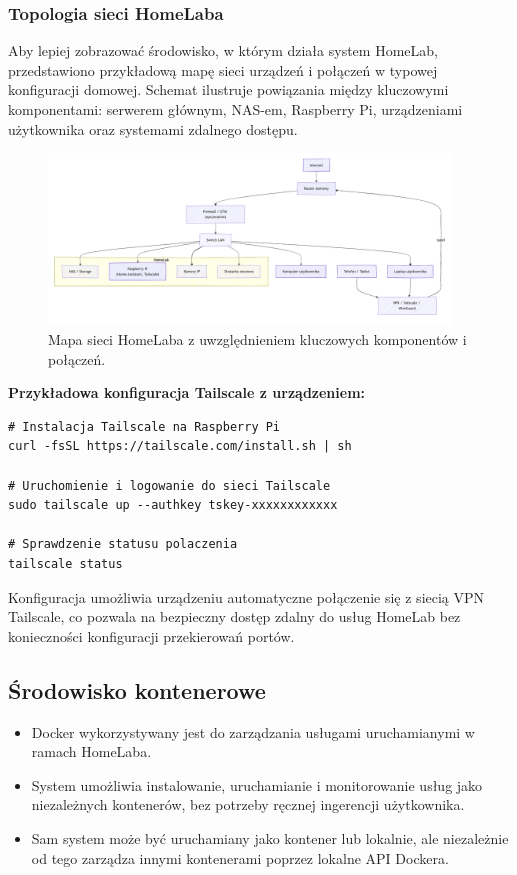 \subsubsection{Topologia sieci HomeLaba}
Aby lepiej zobrazować środowisko, w którym działa system HomeLab, przedstawiono przykładową mapę sieci urządzeń i połączeń w typowej konfiguracji domowej. Schemat ilustruje powiązania między kluczowymi komponentami: serwerem głównym, NAS-em, Raspberry Pi, urządzeniami użytkownika oraz systemami zdalnego dostępu.

\begin{figure}[H]
\centering
\includegraphics[width=0.95\textwidth]{./chapters/mermeid/schemat sieci homelab.png}
\caption{Mapa sieci HomeLaba z uwzględnieniem kluczowych komponentów i połączeń.}
\label{fig:network_map}
\end{figure}
\textbf{Przykładowa konfiguracja Tailscale z urządzeniem:}

\begin{lstlisting}
# Instalacja Tailscale na Raspberry Pi
curl -fsSL https://tailscale.com/install.sh | sh

# Uruchomienie i logowanie do sieci Tailscale
sudo tailscale up --authkey tskey-xxxxxxxxxxxx

# Sprawdzenie statusu polaczenia
tailscale status
\end{lstlisting}

Konfiguracja umożliwia urządzeniu automatyczne połączenie się z siecią VPN Tailscale, co pozwala na bezpieczny dostęp zdalny do usług HomeLab bez konieczności konfiguracji przekierowań portów.

\subsection{Środowisko kontenerowe}
\begin{itemize}
    \item Docker wykorzystywany jest do zarządzania usługami uruchamianymi w ramach HomeLaba.
    \item System umożliwia instalowanie, uruchamianie i monitorowanie usług jako niezależnych kontenerów, bez potrzeby ręcznej ingerencji użytkownika.
    \item Sam system może być uruchamiany jako kontener lub lokalnie, ale niezależnie od tego zarządza innymi kontenerami poprzez lokalne API Dockera.
\end{itemize}

